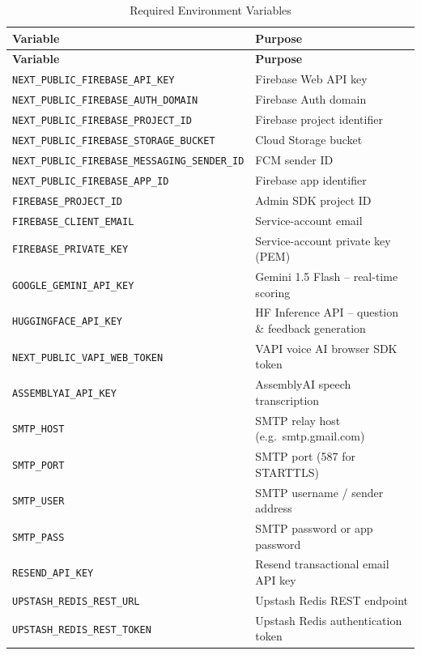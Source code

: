 \begin{longtable}{|p{5.8cm}|p{7.5cm}|}
\caption{Required Environment Variables}\label{tab:env_vars} \\
\hline
\textbf{Variable} & \textbf{Purpose} \\
\hline
\endfirsthead
\hline
\textbf{Variable} & \textbf{Purpose} \\
\hline
\endhead
\hline
\endfoot
\texttt{NEXT\_PUBLIC\_FIREBASE\_API\_KEY}          & Firebase Web API key \\
\hline
\texttt{NEXT\_PUBLIC\_FIREBASE\_AUTH\_DOMAIN}      & Firebase Auth domain \\
\hline
\texttt{NEXT\_PUBLIC\_FIREBASE\_PROJECT\_ID}       & Firebase project identifier \\
\hline
\texttt{NEXT\_PUBLIC\_FIREBASE\_STORAGE\_BUCKET}   & Cloud Storage bucket \\
\hline
\texttt{NEXT\_PUBLIC\_FIREBASE\_MESSAGING\_SENDER\_ID} & FCM sender ID \\
\hline
\texttt{NEXT\_PUBLIC\_FIREBASE\_APP\_ID}           & Firebase app identifier \\
\hline
\texttt{FIREBASE\_PROJECT\_ID}                     & Admin SDK project ID \\
\hline
\texttt{FIREBASE\_CLIENT\_EMAIL}                   & Service-account email \\
\hline
\texttt{FIREBASE\_PRIVATE\_KEY}                    & Service-account private key (PEM) \\
\hline
\texttt{GOOGLE\_GEMINI\_API\_KEY}                  & Gemini 1.5 Flash -- real-time scoring \\
\hline
\texttt{HUGGINGFACE\_API\_KEY}                     & HF Inference API -- question \& feedback generation \\
\hline
\texttt{NEXT\_PUBLIC\_VAPI\_WEB\_TOKEN}            & VAPI voice AI browser SDK token \\
\hline
\texttt{ASSEMBLYAI\_API\_KEY}                      & AssemblyAI speech transcription \\
\hline
\texttt{SMTP\_HOST}                                & SMTP relay host (e.g.\ smtp.gmail.com) \\
\hline
\texttt{SMTP\_PORT}                                & SMTP port (587 for STARTTLS) \\
\hline
\texttt{SMTP\_USER}                                & SMTP username / sender address \\
\hline
\texttt{SMTP\_PASS}                                & SMTP password or app password \\
\hline
\texttt{RESEND\_API\_KEY}                          & Resend transactional email API key \\
\hline
\texttt{UPSTASH\_REDIS\_REST\_URL}                 & Upstash Redis REST endpoint \\
\hline
\texttt{UPSTASH\_REDIS\_REST\_TOKEN}               & Upstash Redis authentication token \\
\hline
\end{longtable}

